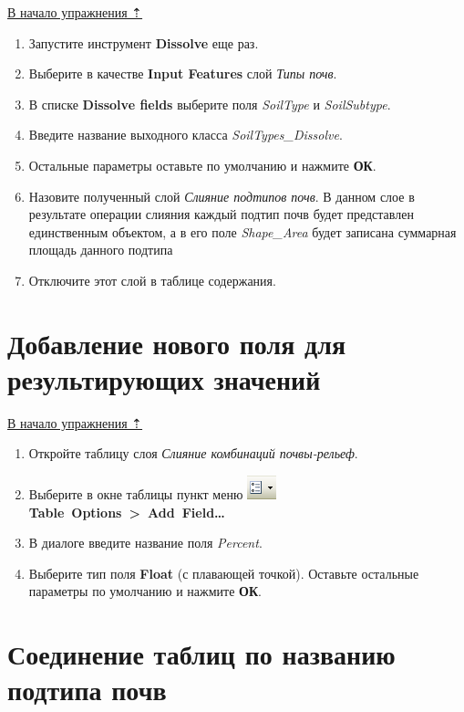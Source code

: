 \documentclass[12pt,]{book}
\begin{document}
\protect\hyperlink{overlay}{В начало упражнения ⇡}

\begin{enumerate}
\def\labelenumi{\arabic{enumi}.}
\item
  Запустите инструмент \textbf{Dissolve} еще раз.
\item
  Выберите в качестве \textbf{Input Features} слой \emph{Типы почв}.
\item
  В списке \textbf{Dissolve fields} выберите поля \emph{SoilType} и \emph{SoilSubtype}.
\item
  Введите название выходного класса \emph{SoilTypes\_Dissolve}.
\item
  Остальные параметры оставьте по умолчанию и нажмите \textbf{ОК}.
\item
  Назовите полученный слой \emph{Слияние подтипов почв}. В данном слое в результате операции слияния каждый подтип почв будет представлен единственным объектом, а в его поле \emph{Shape\_Area} будет записана суммарная площадь данного подтипа
\item
  Отключите этот слой в таблице содержания.
\end{enumerate}

\hypertarget{overlay-field}{%
\section{Добавление нового поля для результирующих значений}\label{overlay-field}}

\protect\hyperlink{overlay}{В начало упражнения ⇡}

\begin{enumerate}
\def\labelenumi{\arabic{enumi}.}
\item
  Откройте таблицу слоя \emph{Слияние комбинаций почвы-рельеф}.
\item
  Выберите в окне таблицы пункт меню \includegraphics{images/Ex10/image11.png} \textbf{Table~Options~\textgreater{}~Add~Field\ldots{}}
\item
  В диалоге введите название поля \emph{Percent}.
\item
  Выберите тип поля \textbf{Float} (с плавающей точкой). Оставьте остальные параметры по умолчанию и нажмите \textbf{ОК}.
\end{enumerate}

\hypertarget{overlay-join}{%
\section{Соединение таблиц по названию подтипа почв}\label{overlay-join}}
\end{document}
